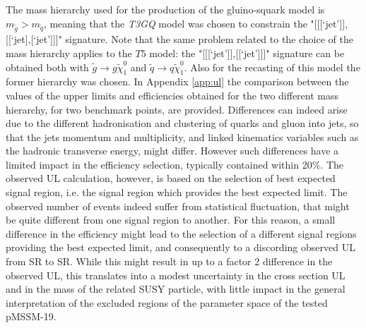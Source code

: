 \documentclass[epj,nopacs,fleqn]{svjour}
\begin{document}
The mass hierarchy used for the production of the gluino-squark model is $m_{\tilde g} > m_{\tilde q}$, meaning that the \textit{T3GQ} model was chosen to constrain the "[[[`jet']],[[`jet],[`jet']]]" signature. Note that the same problem related to the choice of the mass hierarchy applies to the $T5$ model: the "[[[`jet']],[[`jet']]]" signature can be obtained both with $\tilde g \rightarrow g \tilde \chi _1 ^0$ and $\tilde q \rightarrow q \tilde \chi _1 ^0$. Also for the recasting of this model the former hierarchy was chosen. In Appendix \ref{app:ul} the comparison between the values of the upper limits and efficiencies obtained for the two different mass hierarchy, for two benchmark points, are provided. Differences can indeed arise due to the different hadronisation and clustering of quarks and gluon into jets, so that the jets momentum and multiplicity, and linked kinematics variables such as the hadronic transverse energy, might differ. However such differences have a limited impact in the efficiency selection, typically contained within 20$\%$. The observed UL calculation, however, is based on the selection of best expected signal region, i.e. the signal region which provides the best expected limit. The observed number of events indeed suffer from statistical fluctuation, that might be quite different from one signal region to another. For this reason, a small difference in the efficiency might lead to the selection of a different signal regions providing the best expected limit, and consequently to a discording observed UL from SR to SR. While this might result in up to a factor 2 difference in the observed UL, this translates into a modest uncertainty in the cross section UL and in the mass of the related SUSY particle, with little impact in the general interpretation of the excluded regions of the parameter space of the tested pMSSM-19. 



%
\end{document}
